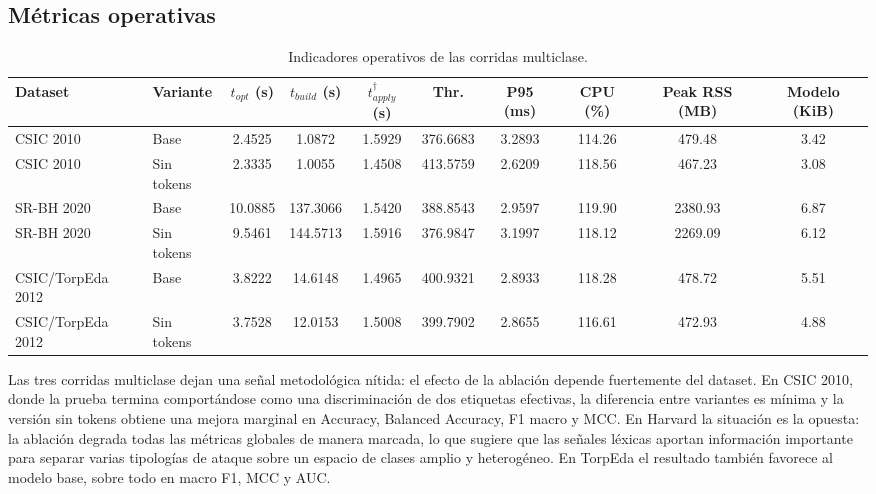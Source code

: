\documentclass[12pt,oneside]{report}
\begin{document}
\subsection{Métricas operativas}
\begin{table}[H]
\centering
\caption{Indicadores operativos de las corridas multiclase.}
\label{tab:res-mc-op}
\scriptsize
\renewcommand{\arraystretch}{1.12}
\begin{adjustbox}{max width=\textwidth}
\begin{tabular}{llcccccccc}
\toprule
\textbf{Dataset} & \textbf{Variante} & $t_{opt}$ (s) & $t_{build}$ (s) & $t_{apply}^{\dagger}$ (s) & \textbf{Thr.} & \textbf{P95} (ms) & \textbf{CPU} (\%) & \textbf{Peak RSS} (MB) & \textbf{Modelo} (KiB) \\
\midrule
CSIC 2010 & Base & 2.4525 & 1.0872 & 1.5929 & 376.6683 & 3.2893 & 114.26 & 479.48 & 3.42 \\CSIC 2010 & Sin tokens & 2.3335 & 1.0055 & 1.4508 & 413.5759 & 2.6209 & 118.56 & 467.23 & 3.08 \\SR-BH 2020 & Base & 10.0885 & 137.3066 & 1.5420 & 388.8543 & 2.9597 & 119.90 & 2380.93 & 6.87 \\SR-BH 2020 & Sin tokens & 9.5461 & 144.5713 & 1.5916 & 376.9847 & 3.1997 & 118.12 & 2269.09 & 6.12 \\CSIC/TorpEda 2012 & Base & 3.8222 & 14.6148 & 1.4965 & 400.9321 & 2.8933 & 118.28 & 478.72 & 5.51 \\CSIC/TorpEda 2012 & Sin tokens & 3.7528 & 12.0153 & 1.5008 & 399.7902 & 2.8655 & 116.61 & 472.93 & 4.88 \\\bottomrule
\end{tabular}
\end{adjustbox}
\end{table}

Las tres corridas multiclase dejan una señal metodológica nítida: el efecto de la ablación depende fuertemente del dataset. En CSIC 2010, donde la prueba termina comportándose como una discriminación de dos etiquetas efectivas, la diferencia entre variantes es mínima y la versión sin tokens obtiene una mejora marginal en Accuracy, Balanced Accuracy, F1 macro y MCC. En Harvard la situación es la opuesta: la ablación degrada todas las métricas globales de manera marcada, lo que sugiere que las señales léxicas aportan información importante para separar varias tipologías de ataque sobre un espacio de clases amplio y heterogéneo. En TorpEda el resultado también favorece al modelo base, sobre todo en macro F1, MCC y AUC.\
\end{document}
